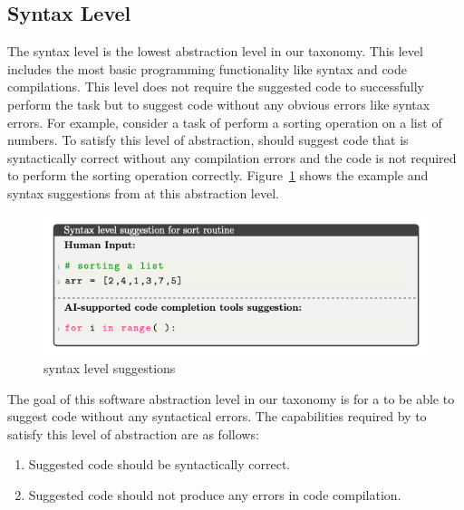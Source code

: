 \subsection{Syntax Level}
\label{syntax}
The syntax level is the lowest abstraction level in our taxonomy. This level includes the most basic programming functionality like syntax and code compilations. This level does not require the \cct{} suggested code to successfully perform the task but to suggest code without any obvious errors like syntax errors.
For example, consider a task of perform a sorting operation on a list of numbers. To satisfy this level of abstraction, \cct{} should suggest code that is syntactically correct without any compilation errors and the code is not required to perform the sorting operation correctly. 
Figure~\ref{fig:syntax} shows the example and syntax suggestions from \cct{} at this abstraction level.

\begin{figure}[hbt!]
    \centering
    \includegraphics[width=\linewidth]{Figures/syntax.png}
    \caption{\cct{} syntax level suggestions}
    \label{fig:syntax}
\end{figure}

The goal of this software abstraction level in our taxonomy is for a \cct{} to be able to suggest code without any syntactical errors.
The capabilities required by \cct{} to satisfy this level of abstraction are as follows:

\begin{enumerate}
    \item Suggested code should be syntactically correct.
    \item Suggested code should not produce any errors in code compilation.
\end{enumerate}

